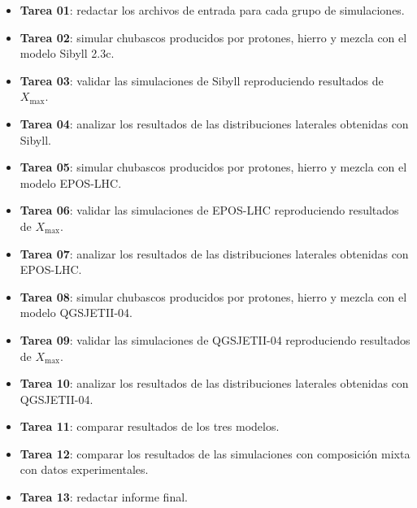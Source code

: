 \begin{itemize}
\item \textbf{Tarea 01}: redactar los archivos de entrada para cada grupo de simulaciones.	

\item \textbf{Tarea 02}: simular chubascos producidos por protones, hierro y mezcla con el modelo Sibyll 2.3c.

\item \textbf{Tarea 03}: validar las simulaciones de Sibyll reproduciendo resultados de $X_{\text{max}}$.

\item \textbf{Tarea 04}: analizar los resultados de las distribuciones laterales obtenidas con Sibyll.

\item \textbf{Tarea 05}: simular chubascos producidos por protones, hierro y mezcla con el modelo EPOS-LHC.

\item \textbf{Tarea 06}: validar las simulaciones de EPOS-LHC reproduciendo resultados de $X_{\text{max}}$.

\item \textbf{Tarea 07}: analizar los resultados de las distribuciones laterales obtenidas con EPOS-LHC.

\item \textbf{Tarea 08}: simular chubascos producidos por protones, hierro y mezcla con el modelo QGSJETII-04.

\item \textbf{Tarea 09}: validar las simulaciones de QGSJETII-04 reproduciendo resultados de $X_{\text{max}}$.

\item \textbf{Tarea 10}: analizar los resultados de las distribuciones laterales obtenidas con QGSJETII-04.

\item \textbf{Tarea 11}: comparar resultados de los tres modelos.

\item \textbf{Tarea 12}: comparar los resultados de las simulaciones con composición mixta con datos experimentales.

\item \textbf{Tarea 13}: redactar informe final.
\end{itemize}



